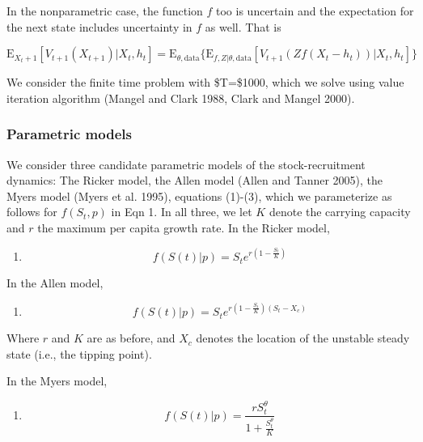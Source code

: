 \documentclass[]{components/elsarticle}
\begin{document}
In the nonparametric case, the function $f$ too is uncertain and the
expectation for the next state includes uncertainty in $f$ as well. That
is

\[\mathbf{\mathrm{E}}_{X_t+1} \left[ V_{t+1}( X_{t+1}) | X_t, h_t \right] = \mathbf{\mathrm{E}}_{\theta,\mathrm{data}} \{ \mathbf{\mathrm{E}}_{f, Z | \theta, \mathrm{data}} \left[ V_{t+1}( Z f(X_t - h_t))  | X_t, h_t \right] \}\]

We consider the finite time problem with \$T=\$1000, which we solve
using value iteration algorithm (Mangel and Clark 1988, Clark and Mangel
2000).

\subsubsection{Parametric models}\label{parametric-models}

We consider three candidate parametric models of the stock-recruitment
dynamics: The Ricker model, the Allen model (Allen and Tanner 2005), the
Myers model (Myers et al. 1995), equations (1)-(3), which we
parameterize as follows for $f(S_t,p)$ in Eqn 1. In all three, we let
$K$ denote the carrying capacity and $r$ the maximum per capita growth
rate. In the Ricker model,

\begin{enumerate}
\def\labelenumi{(\arabic{enumi})}
\itemsep1pt\parskip0pt
\item
  \[ f(S(t)|p) = S_t e^{r \left(1 - \frac{S_t}{K} \right) } \]
\end{enumerate}

In the Allen model,

\begin{enumerate}
\def\labelenumi{(\arabic{enumi})}
\setcounter{enumi}{1}
\itemsep1pt\parskip0pt
\item
  \[ f(S(t)|p) = S_t e^{r \left(1 - \frac{S_t}{K}\right)\left(S_t - X_c\right)} \]
\end{enumerate}

Where $r$ and $K$ are as before, and $X_c$ denotes the location of the
unstable steady state (i.e., the tipping point).

In the Myers model,

\begin{enumerate}
\def\labelenumi{(\arabic{enumi})}
\setcounter{enumi}{2}
\itemsep1pt\parskip0pt
\item
  \[ f(S(t) | p)  = \frac{r S_t^{\theta}}{1 + \frac{S_t^\theta}{K}}\]
\end{enumerate}
\end{document}
